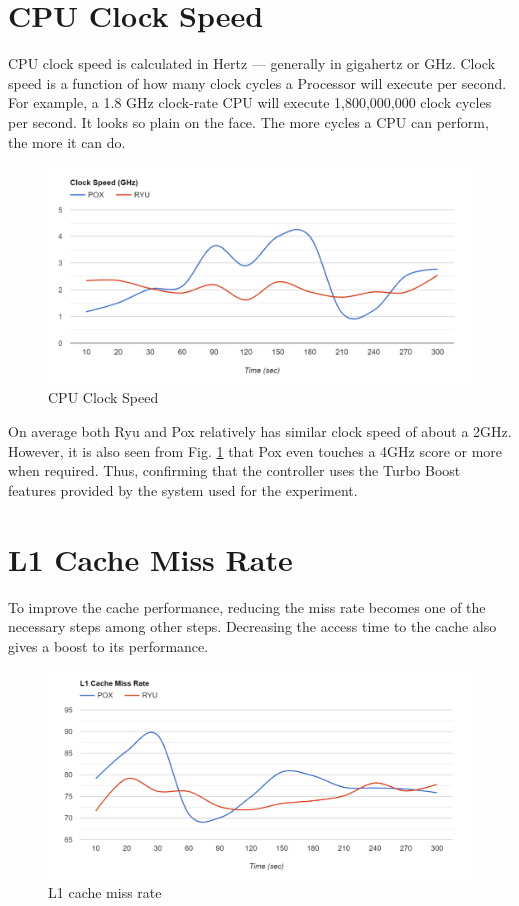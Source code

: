 \section{CPU Clock Speed}

CPU clock speed is calculated in Hertz — generally in gigahertz or GHz. Clock speed is a function of how many
clock cycles a Processor will execute per second. For example, a 1.8 GHz clock-rate CPU will execute 1,800,000,000 clock cycles per second. It looks so plain on the face. The more cycles a CPU can perform, the more it can do.

\begin{figure}[!hbt]
    \centering
        \includegraphics[width=\textwidth,keepaspectratio]{images/clock_speed.png}
       \caption{CPU Clock Speed}
        \label{clockspeed}
\end{figure}

On average both Ryu and Pox relatively has similar clock speed of about a 2GHz. However, it is also seen from Fig. \ref{clockspeed} that Pox even touches a 4GHz score or more when required. Thus, confirming that the controller uses the Turbo Boost features provided by the system used for the experiment.

\section{L1 Cache Miss Rate}

To improve the cache performance, reducing the miss rate becomes one of the necessary steps among other steps. Decreasing the access time to the cache also gives a boost to its performance.

\begin{figure}[!hbt]
    \centering
        \includegraphics[width=\textwidth,keepaspectratio]{images/l1_miss_rate.png}
       \caption{L1 cache miss rate}
        \label{l1missrate}
\end{figure}


